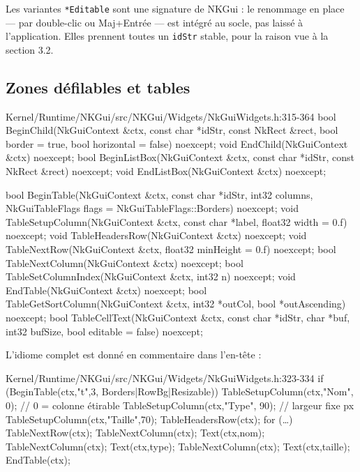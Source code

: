 Les variantes \texttt{*Editable} sont une signature de NKGui : le renommage en
place — par double-clic ou Maj+Entrée — est intégré au socle, pas laissé à
l'application. Elles prennent toutes un \texttt{idStr} stable, pour la raison
vue à la section 3.2.

\subsection{Zones défilables et tables}

\begin{nkcode}{Kernel/Runtime/NKGui/src/NKGui/Widgets/NkGuiWidgets.h:315-364}
bool BeginChild(NkGuiContext &ctx, const char *idStr, const NkRect &rect, bool border = true,
                bool horizontal = false) noexcept;
void EndChild(NkGuiContext &ctx) noexcept;
bool BeginListBox(NkGuiContext &ctx, const char *idStr, const NkRect &rect) noexcept;
void EndListBox(NkGuiContext &ctx) noexcept;

bool BeginTable(NkGuiContext &ctx, const char *idStr, int32 columns,
                NkGuiTableFlags flags = NkGuiTableFlags::Borders) noexcept;
void TableSetupColumn(NkGuiContext &ctx, const char *label, float32 width = 0.f) noexcept;
void TableHeadersRow(NkGuiContext &ctx) noexcept;
void TableNextRow(NkGuiContext &ctx, float32 minHeight = 0.f) noexcept;
bool TableNextColumn(NkGuiContext &ctx) noexcept;
bool TableSetColumnIndex(NkGuiContext &ctx, int32 n) noexcept;
void EndTable(NkGuiContext &ctx) noexcept;
bool TableGetSortColumn(NkGuiContext &ctx, int32 *outCol, bool *outAscending) noexcept;
bool TableCellText(NkGuiContext &ctx, const char *idStr, char *buf, int32 bufSize,
                   bool editable = false) noexcept;
\end{nkcode}

L'idiome complet est donné en commentaire dans l'en-tête :

\begin{nkcode}{Kernel/Runtime/NKGui/src/NKGui/Widgets/NkGuiWidgets.h:323-334}
if (BeginTable(ctx,"t",3, Borders|RowBg|Resizable)) {
    TableSetupColumn(ctx,"Nom",   0);     // 0 = colonne étirable
    TableSetupColumn(ctx,"Type", 90);     // largeur fixe px
    TableSetupColumn(ctx,"Taille",70);
    TableHeadersRow(ctx);
    for (…) { TableNextRow(ctx);
              TableNextColumn(ctx); Text(ctx,nom);
              TableNextColumn(ctx); Text(ctx,type);
              TableNextColumn(ctx); Text(ctx,taille); }
    EndTable(ctx);
}
\end{nkcode}

